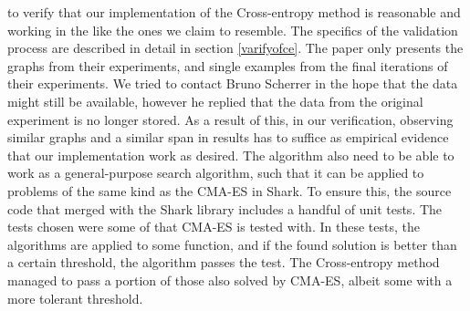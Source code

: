 to verify that our implementation of the Cross-entropy method is reasonable and working in 
the like the ones we claim to resemble. The specifics of the validation process
are described in detail in section \ref{varifyofce}. The paper only presents the
graphs from their experiments, and single examples from the final iterations
of their experiments. We tried to contact Bruno Scherrer in the hope that 
the data might still be available, however he replied that the data from the
original experiment is no longer stored. As a result of this, in our verification,
observing similar graphs and a similar span in results has to suffice as 
empirical evidence that our implementation work as desired. 
The algorithm also need to be able to work as a general-purpose 
search algorithm, such that it can be applied to problems of the same kind as 
the CMA-ES in Shark. To ensure this, the source code that merged with the 
Shark library includes a handful of unit tests. The tests chosen were some
of that CMA-ES is tested with. In these tests, the algorithms are applied to some 
function, and if the found solution is better than a certain threshold, the 
algorithm passes the test. The Cross-entropy method managed to pass a portion 
of those also solved by CMA-ES, albeit some with a more tolerant threshold.



